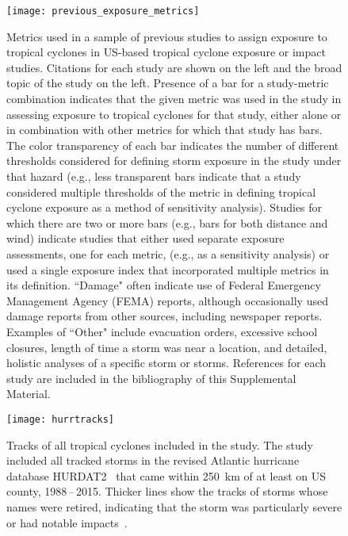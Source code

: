 \documentclass[11pt, titlepage, twoside]{article}
\begin{document}
\begin{figure}[tbhp!]
\centering
\texttt{[image: previous\_exposure\_metrics]}
\caption{Metrics used in a sample of previous studies to assign exposure to
tropical cyclones in \ac{US}-based tropical cyclone exposure or impact studies.
Citations for each study are shown on the left and the broad topic of the study
on the left. Presence of a bar for a study-metric combination indicates that
the given metric was used in the study in assessing exposure to tropical
cyclones for that study, either alone or in combination with other metrics for
which that study has bars. The color transparency of each bar indicates the
number of different thresholds considered for defining storm exposure in the
study under that hazard (e.g., less transparent bars indicate that a study
considered multiple thresholds of the metric in defining tropical cyclone
exposure as a method of sensitivity analysis). Studies for which there are two
or more bars (e.g., bars for both distance and wind) indicate studies that
either used separate exposure assessments, one for each metric, (e.g., as a
sensitivity analysis) or used a single exposure index that incorporated
multiple metrics in its definition. ``Damage" often indicate use of Federal
Emergency Management Agency (FEMA) reports, although occasionally used damage
reports from other sources, including newspaper reports. Examples of ``Other"
include evacuation orders, excessive school closures, length of time a storm
was near a location, and detailed, holistic analyses of a specific storm or
storms. References for each study are included in the bibliography of this
Supplemental Material.}
\label{fig:previousmetrics}
\end{figure}

\nocite{logan2015, gares2014, esnard2011, zandbergen2009, horney2016,
grabich2016, antipova2015post, zahran2010, currie2013, grabich2015,
grabich2016hurricane, amstadter2010, acierno2006, le2013, lieberman2017,
mckinney2011, dosa2012evacuate, swerdel2014, czajkowski2011, mongin2017,
kessler2007hurricane, caillouet2008increase, rosenheim2018disaster,
domino2003disasters, kim2016, kinney2008, kim2015, tansel2010, escobedo2009,
fuller2014, baggerly2008impact, strobl2011economic, mukherjee2017}

\newpage

\begin{figure}[tbhp!]
\centering
\texttt{[image: hurrtracks]}
\caption{Tracks of all tropical cyclones included in the study. The study
included all tracked storms in the revised Atlantic hurricane database
\ac{HURDAT2}~\citep{landsea2013} that came within 250~\si{\kilo\metre} of at least on
\ac{US} county, 1988\,--\,2015. Thicker lines show the tracks of storms whose
names were retired, indicating that the storm was particularly severe or had
notable impacts~\citep{retirednames}.}
\label{fig:hurrtracks}
\end{figure}
\end{document}

